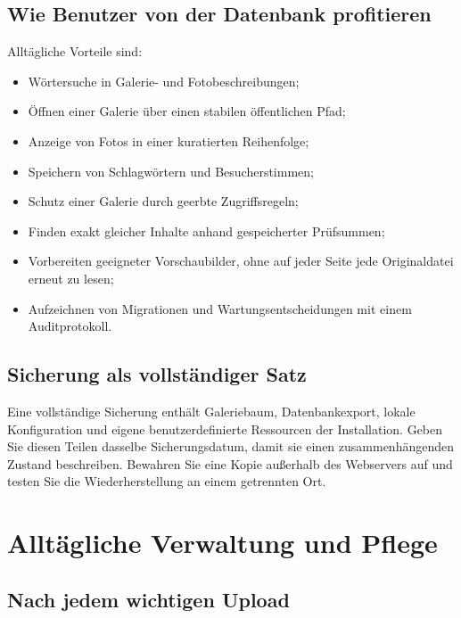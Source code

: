 \documentclass[11pt,a4paper]{article}
\begin{document}
\subsection{Wie Benutzer von der Datenbank profitieren}

Alltägliche Vorteile sind:

\begin{itemize}
  \item Wörtersuche in Galerie- und Fotobeschreibungen;
  \item Öffnen einer Galerie über einen stabilen öffentlichen Pfad;
  \item Anzeige von Fotos in einer kuratierten Reihenfolge;
  \item Speichern von Schlagwörtern und Besucherstimmen;
  \item Schutz einer Galerie durch geerbte Zugriffsregeln;
  \item Finden exakt gleicher Inhalte anhand gespeicherter Prüfsummen;
  \item Vorbereiten geeigneter Vorschaubilder, ohne auf jeder Seite jede
  Originaldatei erneut zu lesen;
  \item Aufzeichnen von Migrationen und Wartungsentscheidungen mit einem
  Auditprotokoll.
\end{itemize}

\subsection{Sicherung als vollständiger Satz}

Eine vollständige Sicherung enthält Galeriebaum, Datenbankexport, lokale
Konfiguration und eigene benutzerdefinierte Ressourcen der Installation. Geben
Sie diesen Teilen dasselbe Sicherungsdatum, damit sie einen zusammenhängenden
Zustand beschreiben. Bewahren Sie eine Kopie außerhalb des Webservers auf und
testen Sie die Wiederherstellung an einem getrennten Ort.
\section{Alltägliche Verwaltung und Pflege}
\label{sec:daily-care}

\subsection{Nach jedem wichtigen Upload}
\end{document}
